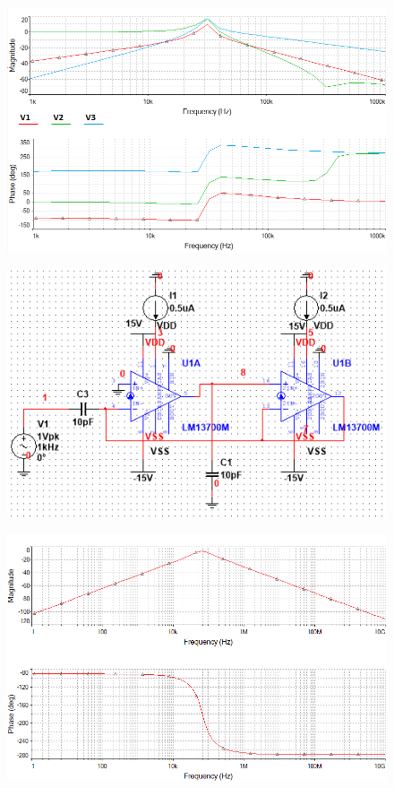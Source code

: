 \documentclass[twoside]{article}
\begin{document}
\begin{figure}[H]
\centering
\includegraphics[scale=0.65]{bplphp2.png}
\end{figure}
\begin{figure}[H]
\centering
\includegraphics[scale=0.7]{pp2.png}
\end{figure}
\begin{figure}[H]
\centering
\includegraphics[scale=0.65]{pp.png}
\end{figure}
\end{document}
